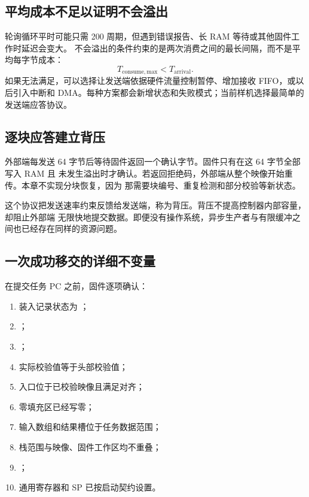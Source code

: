 \subsection{平均成本不足以证明不会溢出}

轮询循环平时可能只需 200 周期，但遇到错误报告、长 RAM 等待或其他固件工作时延迟会变大。
不会溢出的条件约束的是两次消费之间的最长间隔，而不是平均每字节成本：
\[
T_{\mathrm{consume,max}} < T_{\mathrm{arrival}}.
\]
如果无法满足，可以选择让发送端依据硬件流量控制暂停、增加接收 FIFO，或以后引入中断和
DMA。每种方案都会新增状态和失败模式；当前样机选择最简单的发送端应答协议。

\subsection{逐块应答建立背压}

外部端每发送 64 字节后等待固件返回一个确认字节。固件只有在这 64 字节全部写入 RAM 且
未发生溢出时才确认。若返回拒绝码，外部端从整个映像开始重传。本章不实现分块恢复，因为
那需要块编号、重复检测和部分校验等新状态。

这个协议把发送速率约束反馈给发送端，称为背压。背压不提高控制器内部容量，却阻止外部端
无限快地提交数据。即便没有操作系统，异步生产者与有限缓冲之间也已经存在同样的资源问题。

\subsection{一次成功移交的详细不变量}

在提交任务 PC 之前，固件逐项确认：

\begin{enumerate}
\item 装入记录状态为 ；
\item {}；
\item {}；
\item 实际校验值等于头部校验值；
\item 入口位于已校验映像且满足对齐；
\item 零填充区已经写零；
\item 输入数组和结果槽位于任务数据范围；
\item 栈范围与映像、固件工作区均不重叠；
\item {}；
\item 通用寄存器和 SP 已按启动契约设置。
\end{enumerate}

